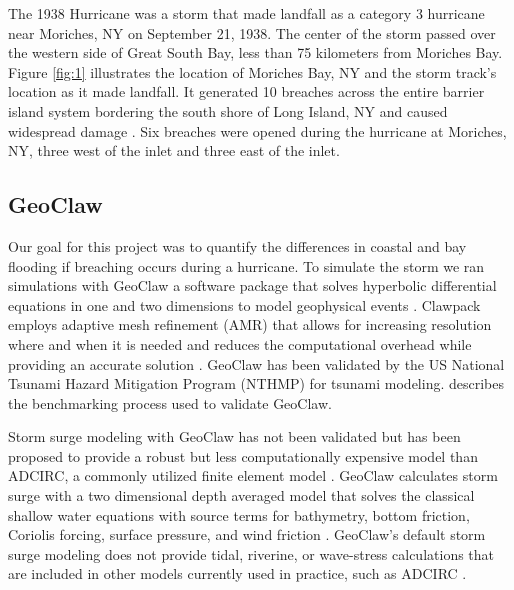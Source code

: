 \documentclass{coastal_paper}
\begin{document}
The 1938 Hurricane was a storm that made landfall as a category 3 hurricane near Moriches, NY on September 21, 1938. The center of the storm passed over the western side of Great South Bay, less than 75 kilometers from Moriches Bay. Figure \ref{fig:1} illustrates the location of Moriches Bay, NY and the storm track's location as it made landfall. It generated 10 breaches across the entire barrier island system bordering the south shore of Long Island, NY and caused widespread damage \citep{morang1999shinnecock, coch1994hurricane, canizares2008simulation}. Six breaches were opened during the hurricane at Moriches, NY, three west of the inlet and three east of the inlet. 

\subsection{GeoClaw}
Our goal for this project was to quantify the differences in coastal and bay flooding if breaching occurs during a hurricane. To simulate the storm we ran simulations with GeoClaw a software package that solves hyperbolic differential equations in one and two dimensions to model geophysical events \citep{clawpack, mandli2016clawpack}. Clawpack employs adaptive mesh refinement (AMR) that allows for increasing resolution where and when it is needed and reduces the computational overhead while providing an accurate solution \citep{berger2011geoclaw}. GeoClaw has been validated by the US National Tsunami Hazard Mitigation Program (NTHMP) for tsunami modeling. \citep{gonzalez2011validation} describes the benchmarking process used to validate GeoClaw. 

Storm surge modeling with GeoClaw has not been validated but has been proposed to provide a robust but less computationally expensive model than ADCIRC, a commonly utilized finite element model \citep{westerink2008basin, mandli2014adaptive}. GeoClaw calculates storm surge with a two dimensional depth averaged model that solves the classical shallow water equations with source terms for bathymetry, bottom friction, Coriolis forcing, surface pressure, and wind friction \citep{mandli2014adaptive}. GeoClaw's default storm surge modeling does not provide tidal, riverine, or wave-stress calculations that are included in other models currently used in practice, such as ADCIRC \citep{westerink2008basin, mandli2014adaptive}.
\end{document}
